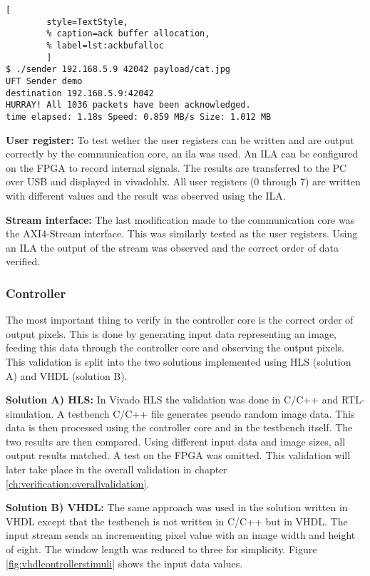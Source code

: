 \begin{minipage}{1\linewidth}
    \begin{lstlisting}[
        style=TextStyle, 
        % caption=ack buffer allocation, 
        % label=lst:ackbufalloc
        ]
$ ./sender 192.168.5.9 42042 payload/cat.jpg
UFT Sender demo
destination 192.168.5.9:42042
HURRAY! All 1036 packets have been acknowledged.
time elapsed: 1.18s Speed: 0.859 MB/s Size: 1.012 MB\end{lstlisting}
\end{minipage}

\vspace{1ex}
\textbf{User register:} To test wether the user registers can be written and are
output correctly by the communication core, an \gls{ila} 
was used. An ILA can be configured on the FPGA to record internal signals. The
results are transferred to the PC over USB and displayed in \gls{vivadohlx}. All
user registers (0 through 7) are written with different values and the result
was observed using the ILA.

\vspace{1ex}
\textbf{Stream interface:} The last modification made to the communication core
was the AXI4-Stream interface. This was similarly tested as the user registers.
Using an ILA the output of the stream was observed and the correct order of data
verified. 

\subsubsection*{Controller} 
The most important thing to verify in the controller core is the correct order
of output pixels. This is done by generating input data representing an image,
feeding this data through the controller core and observing the output pixels.
This validation is split into the two solutions implemented using HLS (solution
A) and VHDL (solution B).

\vspace{1ex}
\textbf{Solution A) HLS:} In Vivado HLS the validation was done in C/C++ and
RTL-simulation. A testbench C/C++ file generates pseudo random image data. This
data is then processed using the controller core and in the testbench itself.
The two results are then compared. Using different input data and image sizes,
all output results matched. A test on the FPGA was omitted. This validation will
later take place in the overall validation in chapter \ref{ch:verification:overallvalidation}.

\vspace{1ex}
\textbf{Solution B) VHDL:} The same approach was used in the solution written in
VHDL except that the testbench is not written in C/C++ but in VHDL. The input
stream sends an incrementing pixel value with an image width and height of
eight. The window length was reduced to three for simplicity. Figure 
\ref{fig:vhdlcontrollerstimuli} shows the input data values.


